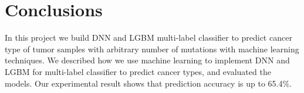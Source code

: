 \section{Conclusions}

In this project we build DNN and LGBM multi-label classifier to predict cancer type of tumor samples with arbitrary number of mutations with machine learning techniques. We described how we use machine learning to implement DNN and LGBM for multi-label classifier to predict cancer types, and evaluated the models. Our experimental result shows that prediction accuracy is up to 65.4\%.
